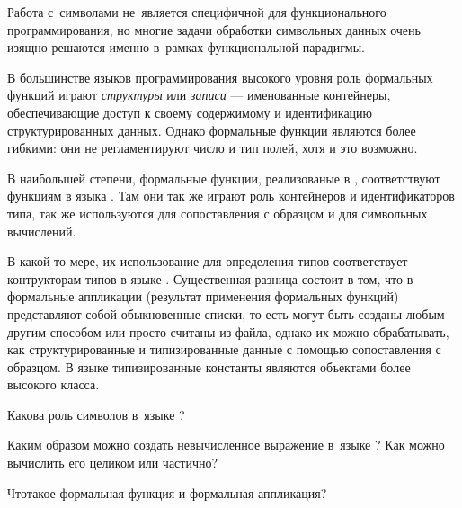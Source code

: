 Работа с~символами не~является специфичной для функционального программирования, но многие задачи обработки символьных данных очень изящно решаются именно в~рамках функциональной парадигмы. 

В большинстве языков программирования высокого уровня роль формальных функций играют \emph{структуры} или \emph{записи} --- именованные контейнеры, обеспечивающие доступ к своему содержимому и идентификацию структурированных данных. Однако  формальные функции являются более гибкими: они не регламентируют число и тип полей, хотя и это возможно.

В наибольшей степени, формальные функции, реализованые в \Scheme, соответствуют функциям в языка . Там они так же играют роль контейнеров и идентификаторов типа, так же используются для сопоставления с образцом и для символьных вычислений.

В какой-то мере, их использование для определения типов соответствует контрукторам типов в языке . Существенная разница состоит в том, что в \Scheme формальные аппликации (результат применения формальных функций) представляют собой обыкновенные списки, то есть могут быть созданы любым другим способом или просто считаны из файла, однако их можно обрабатывать, как структурированные и типизированные данные с помощью сопоставления с образцом. В языке  типизированные константы являются объектами более высокого класса.

\newpage
\begin{Queeze}
 \item Какова роль символов в~языке \Scheme?

 \item Каким образом можно создать невычисленное выражение в~языке \Scheme? Как можно вычислить его целиком или частично?

 \item Чтотакое формальная функция и формальная аппликация?
\end{Queeze}
